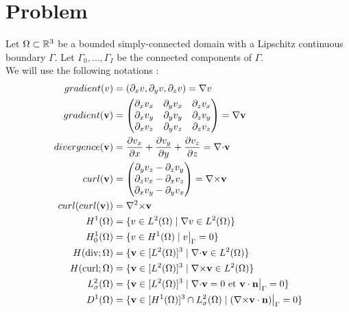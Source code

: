 \part{Problem}
\label{partProb}
Let $\Omega\subset{\mathbb{R}}^3$ be a bounded simply-connected domain with a
Lipschitz continuous boundary $\Gamma$. Let $\Gamma_0,\dots,\Gamma_I$
be the connected components of $\Gamma$.\\

We will use the following notations :
\begin{align*}
gradient(v)&=(\partial_x v, \partial_y v, \partial_z v)={\nabla} v\\
gradient({\mathbf{v}})&=\begin{pmatrix}
\partial_x v_x & \partial_y v_x & \partial_z v_x\\
\partial_x v_y & \partial_y v_y & \partial_z v_y\\
\partial_x v_z & \partial_y v_z & \partial_z v_z
\end{pmatrix}={\nabla}{\mathbf{v}}\\
divergence({\mathbf{v}})&=\frac{\partial v_x}{\partial x}+\frac{\partial v_y}{\partial y}+\frac{\partial v_z}{\partial z}={\nabla\cdot} {\mathbf{v}}\\
curl({\mathbf{v}})&=\begin{pmatrix}
\partial_y v_z - \partial_z v_y\\
\partial_z v_x - \partial_x v_z\\
\partial_x v_y - \partial_y v_x
\end{pmatrix}={\nabla\times} {\mathbf{v}}\\
curl(curl({\mathbf{v}}))&={\nabla^2\times} {\mathbf{v}}\\
H^1(\Omega) &= \{v \in L^2(\Omega)\;|\; {\nabla} v\in L^2(\Omega)\}\\
H^1_0(\Omega) &= \{v \in H^1(\Omega)\; |\; v{\big\rvert_{\Gamma}} = 0\}\\
H(\mathrm{div};\Omega) &= \{{\mathbf{v}} \in [L^2(\Omega)]^3\; |\; {\nabla\cdot}{\mathbf{v}} \in L^2(\Omega) \}\\
H(\mathrm{curl};\Omega) &= \{{\mathbf{v}} \in [L^2(\Omega)]^3\; |\; {\nabla\times}{\mathbf{v}} \in L^2(\Omega) \}\\
L^2_\sigma(\Omega) &= \{{\mathbf{v}} \in [L^2(\Omega)]^3\; |\; {\nabla\cdot} {\mathbf{v}} = 0\text{ et }{\mathbf{v}}\cdot {\mathbf{n}}{\big\rvert_{\Gamma}} = 0 \}\\
D^1(\Omega) &= \{{\mathbf{v}} \in [H^1(\Omega)]^3\cap L^2_\sigma(\Omega)\; |\; ({\nabla\times} {\mathbf{v}}\cdot {\mathbf{n}}){\big\rvert_{\Gamma}} = 0  \}
\end{align*}

